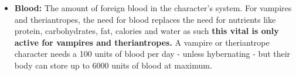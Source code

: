 \begin{itemize}
\item \textbf{Blood:} The amount of foreign blood in the character's system. For vampires and theriantropes, the need for blood replaces the need for nutrients like protein, carbohydrates, fat, calories and water \textemdash as such \textbf{this vital is only active for vampires and theriantropes.} A vampire or theriantrope character needs a 100 units of blood per day - unless hybernating - but their body can store up to 6000 units of blood at maximum. 
\end{itemize}
